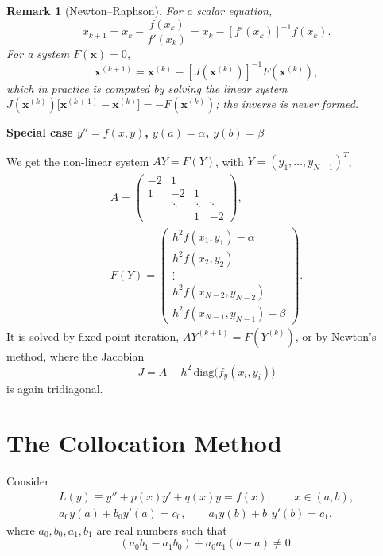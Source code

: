 \documentclass[11pt,a4paper]{article}
\numberwithin{equation}{section}
\theoremstyle{spacedplain}
\theoremstyle{spaceddefinition}
\theoremstyle{spacedremark}
\newtheorem{remark}[theorem]{Remark}
\newcommand{\step}[1]{\par\addvspace{0.6em}\noindent\textbf{#1}\par\nobreak}
\begin{document}
\begin{remark}[Newton--Raphson]
For a scalar equation,
\[
  x_{k+1}=x_k-\frac{f(x_k)}{f'(x_k)}=x_k-[f'(x_k)]^{-1}f(x_k).
\]
For a system \(F(\mathbf x)=0\),
\[
  \mathbf x^{(k+1)}=\mathbf x^{(k)}-[J(\mathbf x^{(k)})]^{-1}F(\mathbf x^{(k)}),
\]
which in practice is computed by solving the linear system
\(J(\mathbf x^{(k)})\bigl[\mathbf x^{(k+1)}-\mathbf x^{(k)}\bigr]
=-F(\mathbf x^{(k)})\); the inverse is never formed.
\end{remark}

\step{Special case \(y''=f(x,y)\), \(y(a)=\alpha\), \(y(b)=\beta\)}

We get the non-linear system \(AY=F(Y)\), with
\(Y=(y_1,\dots,y_{N-1})^T\),
\[
\begin{gathered}
  A=\begin{pmatrix}-2&1&&\\1&-2&1&\\&\ddots&\ddots&\ddots\\&&1&-2\end{pmatrix},
  \\
  F(Y)=\begin{pmatrix}
    h^2f(x_1,y_1)-\alpha\\ h^2f(x_2,y_2)\\ \vdots\\
    h^2f(x_{N-2},y_{N-2})\\ h^2f(x_{N-1},y_{N-1})-\beta
  \end{pmatrix}.
\end{gathered}
\]
It is solved by fixed-point iteration, \(AY^{(k+1)}=F(Y^{(k)})\), or by
Newton's method, where the Jacobian
\[
  J=A-h^2\,\mathrm{diag}\bigl(f_y(x_i,y_i)\bigr)
\]
is again tridiagonal.

\section{The Collocation Method}\label{sec:colloc}

Consider
\begin{equation}\label{eq:colloc1}
\begin{gathered}
  L(y)\equiv y''+p(x)y'+q(x)y=f(x),\qquad x\in(a,b),\\
  a_0y(a)+b_0y'(a)=c_0,\qquad a_1y(b)+b_1y'(b)=c_1,
\end{gathered}
\end{equation}
where \(a_0,b_0,a_1,b_1\) are real numbers such that
\begin{equation}\label{eq:colloc2}
  (a_0b_1-a_1b_0)+a_0a_1(b-a)\ne0.
\end{equation}
\end{document}
